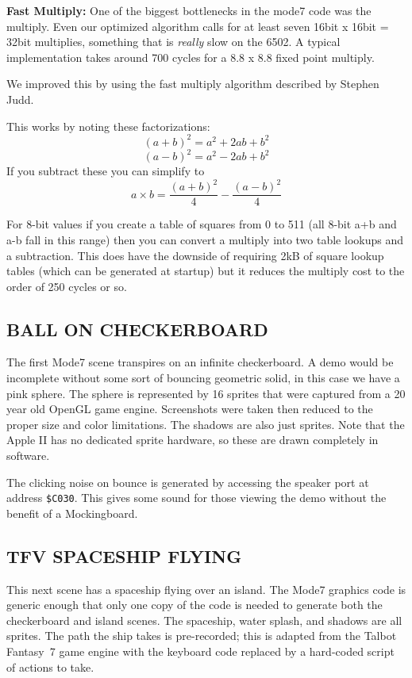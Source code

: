 \documentclass[twocolumn]{article}
\begin{document}
\noindent
{\bf Fast Multiply:}
One of the biggest bottlenecks in the mode7 code was the multiply.
Even our optimized algorithm calls for at least seven
16bit x 16bit = 32bit multiplies, something that is {\em really} slow on 
the 6502.
A typical implementation takes around 700 cycles
for a 8.8 x 8.8 fixed point multiply.

We improved this by using the fast multiply algorithm
described by Stephen Judd.

This works by noting these factorizations:
	\[(a+b)^{2} = a^{2}+2ab+b^{2}\]
	\[(a-b)^{2}=a^{2}-2ab+b^{2}\]
If you subtract these you can simplify to
	\[a\times b =\frac{(a+b)^{2}}{4} - \frac{(a-b)^2}{4}\]

For 8-bit values if you create a table of squares from 0 to 511
(all 8-bit a+b and a-b fall in this range) then you can convert a multiply
into two table lookups and a subtraction.
This does have the downside of requiring 2kB of square lookup tables
(which can be generated at startup) but it reduces the multiply
cost to the order of 250 cycles or so.


\subsection{BALL ON CHECKERBOARD}

The first Mode7 scene transpires on an infinite checkerboard.
A demo would be incomplete without some sort of bouncing geometric solid,
in this case we have a pink sphere.
The sphere is represented by 16 sprites that were captured from
a 20 year old OpenGL game engine.
Screenshots were taken then reduced to the proper size and color
limitations.
The shadows are also just sprites.
Note that the Apple II has no dedicated sprite hardware, so these
are drawn completely in software.

The clicking noise on bounce is generated by accessing the speaker port
at address {\tt \$C030}.
This gives some sound for those viewing the demo without the benefit
of a Mockingboard.

\subsection{TFV SPACESHIP FLYING}

This next scene has a spaceship flying over an island.
The Mode7 graphics code is generic enough that only one copy of the code
is needed to generate both the checkerboard and island scenes.
The spaceship, water splash, and shadows are all sprites.
The path the ship takes is pre-recorded; this is adapted from the
Talbot Fantasy~7 game engine with the keyboard code replaced by a hard-coded
script of actions to take.
\end{document}
